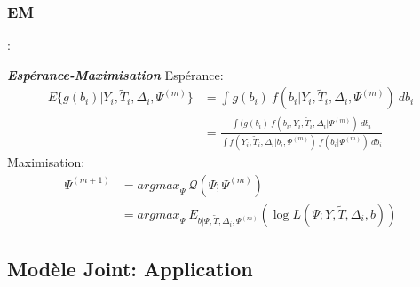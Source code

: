 \documentclass[10pt,  xcolors={RGB}, hyperref={%
    pdfpagelabels=false,
    colorlinks=true,
    pdftex=true,
    bookmarks=true,
    bookmarksopen=true,
    hyperfootnotes=true}]{beamer}
\begin{document}
\subsubsection{EM}
\begin{frame}{\subsecname: \subsubsecname}
\begin{center}\begin{minipage}[t]{0.85\textwidth}\vspace{-1.5em}\begin{block}{\itshape\textbf{Espérance-Maximisation}}
Espérance:
	\vspace{-1em}\begin{align}
		E\{g(b_i)|Y_i, \tilde{T}_i, \Delta_i, \Psi^{(m)}\}&=\int g(b_i)\ f(b_i|Y_i, \tilde{T}_i, \Delta_i, \Psi^{(m)})\ db_i\nonumber\\
		&=\frac{\int(g(b_i)\ f(b_i,Y_i,\tilde{T}_i,\Delta_i|\Psi^{(m)})\ db_i}{\int f(Y_i, \tilde{T}_i,\Delta_i|b_i,\Psi^{(m)})\ f(b_i|\Psi^{(m)})\ db_i}\nonumber
	\end{align}
Maximisation:
	\vspace{-1em}\begin{align}
		\Psi^{(m+1)}&=\textit{argmax}_{\Psi}\ \mathcal{Q}(\Psi; \Psi^{(m)})\nonumber\\
		&=\textit{argmax}_{\Psi}\ E_{b|\Psi, \tilde{T}, \Delta_i, \Psi^{(m)}}(\log L(\Psi; Y, \tilde{T}, \Delta_i, b))\nonumber
	\end{align}
\end{block}\vspace{1.5em}\end{minipage}\end{center}
\end{frame}


\subsection{Modèle Joint: Application}
\begin{frame}{\subsecname}
    \begin{center}
        {\color{black}}}
    \end{center}
\end{frame}
\end{document}
